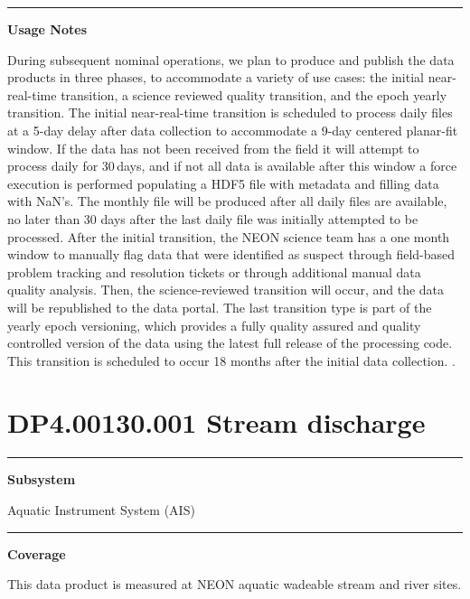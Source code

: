 \documentclass[]{article}
\begin{document}
\begin{center}\rule{0.5\linewidth}{\linethickness}\end{center}

\textbf{Usage Notes}

During subsequent nominal operations, we plan to produce and publish the
data products in three phases, to accommodate a variety of use cases:
the initial near-real-time transition, a science reviewed quality
transition, and the epoch yearly transition. The initial near-real-time
transition is scheduled to process daily files at a 5-day delay after
data collection to accommodate a 9-day centered planar-fit window. If
the data has not been received from the field it will attempt to process
daily for 30\,days, and if not all data is available after this window a
force execution is performed populating a HDF5 file with metadata and
filling data with NaN's. The monthly file will be produced after all
daily files are available, no later than 30 days after the last daily
file was initially attempted to be processed. After the initial
transition, the NEON science team has a one month window to manually
flag data that were identified as suspect through field-based problem
tracking and resolution tickets or through additional manual data
quality analysis. Then, the science-reviewed transition will occur, and
the data will be republished to the data portal. The last transition
type is part of the yearly epoch versioning, which provides a fully
quality assured and quality controlled version of the data using the
latest full release of the processing code. This transition is scheduled
to occur 18 months after the initial data collection. \newpage
.

\section{DP4.00130.001 Stream
discharge}\label{dp4.00130.001-stream-discharge}

\begin{center}\rule{0.5\linewidth}{\linethickness}\end{center}

\textbf{Subsystem}

Aquatic Instrument System (AIS)

\begin{center}\rule{0.5\linewidth}{\linethickness}\end{center}

\textbf{Coverage}

This data product is measured at NEON aquatic wadeable stream and river
sites.
\end{document}
